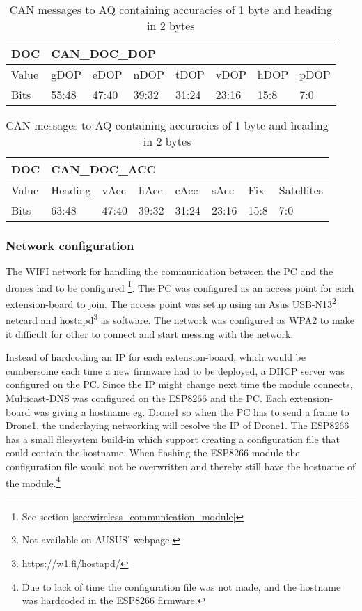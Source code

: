 \begin{table}[H]
	\begin{tabular}{@{}|l|l|l|l|l|l|l|l|@{}}
		\toprule
		DOC   & \multicolumn{7}{l|}{CAN\_DOC\_DOP}                  \\ \midrule
		Value & gDOP  & eDOP  & nDOP  & tDOP  & vDOP  & hDOP & pDOP \\ \midrule
		Bits  & 55:48 & 47:40 & 39:32 & 31:24 & 23:16 & 15:8 & 7:0  \\ \bottomrule
	\end{tabular}
	\caption{CAN messages to \ac{AQ} containing \ac{DOP}s each of 1 byte}
	\label{tab:CAN_DOC_DOP}
	\begin{tabular}{@{}|l|l|l|l|l|l|l|l|@{}}
		\toprule
		DOC   & \multicolumn{7}{l|}{CAN\_DOC\_ACC}                          \\ \midrule
		Value & Heading & vAcc  & hAcc  & cAcc  & sAcc  & Fix  & Satellites \\ \midrule
		Bits  & 63:48   & 47:40 & 39:32 & 31:24 & 23:16 & 15:8 & 7:0        \\ \bottomrule
	\end{tabular}\label{tab:CAN_DOC_ACC}
	\caption{CAN messages to \ac{AQ} containing accuracies of 1 byte and heading in 2 bytes} 
\end{table}

\subsubsection*{Network configuration} 
The WIFI  network for handling the communication between the PC and the drones had to be configured \footnote{See section \ref{sec:wireless_communication_module}}.
The PC was configured as an access point for each extension-board to join. The access point was setup using an Asus USB-N13\footnote{Not available on AUSUS' webpage.} netcard and hostapd\footnote{https://w1.fi/hostapd/} as software. The network was configured as \ac{WPA2} to make it difficult for other to connect and start messing with the network.

Instead of hardcoding an IP for each extension-board, which would be cumbersome each time a new firmware had to be deployed, a \ac{DHCP} server was configured on the PC. Since the IP might change next time the module connects, Multicast-DNS was configured on the ESP8266 and the PC. Each extension-board was giving a hostname eg. Drone1 so when the PC has to send a frame to Drone1, the underlaying networking will resolve the IP of Drone1.
The ESP8266 has a small filesystem build-in which support creating a configuration file that could contain the hostname.
When flashing the ESP8266 module the configuration file would not be overwritten and thereby still have the hostname of the module.\footnote{Due to lack of time the configuration file was not made, and the hostname was hardcoded in the ESP8266 firmware.}


